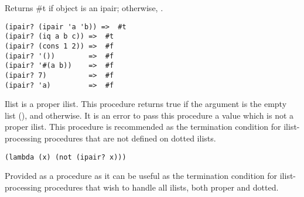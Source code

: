 \begin{entry}{%
  }

  Returns \#t if
  object is an ipair; otherwise, \schfalse{}.

\begin{verbatim}
(ipair? (ipair 'a 'b)) =>  #t
(ipair? (iq a b c)) =>  #t
(ipair? (cons 1 2)) =>  #f
(ipair? '())        =>  #f
(ipair? '#(a b))    =>  #f
(ipair? 7)          =>  #f
(ipair? 'a)         =>  #f
\end{verbatim}
\end{entry}

\begin{entry}{%
  }

  Ilist is a
  proper ilist. This procedure returns true if the argument is the
  empty list (), and \schfalse{} otherwise. It is an error to pass this
  procedure a value which is not a proper ilist. This procedure is
  recommended as the termination condition for ilist-processing
  procedures that are not defined on dotted ilists.
\end{entry}

\begin{entry}{%
  }

\begin{verbatim}
(lambda (x) (not (ipair? x)))
\end{verbatim}

  Provided as a procedure as it can be useful as the termination
  condition for ilist-processing procedures that wish to handle all
  ilists, both proper and dotted.
\end{entry}

